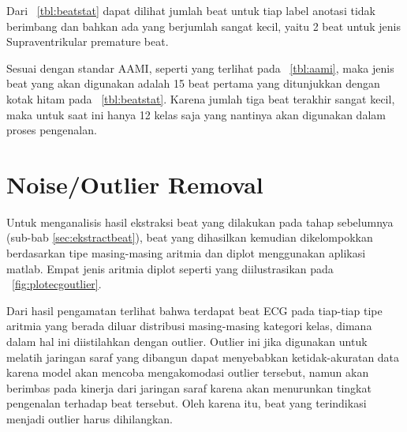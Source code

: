 Dari \tab~\ref{tbl:beatstat} dapat dilihat jumlah beat untuk tiap label anotasi
tidak berimbang dan bahkan ada yang berjumlah sangat kecil, yaitu 2 beat untuk
jenis Supraventrikular premature beat. 



Sesuai dengan standar AAMI, seperti yang terlihat pada \tab~\ref{tbl:aami}, maka
jenis beat yang akan digunakan adalah 15 beat pertama yang ditunjukkan dengan
kotak hitam pada \tab~\ref{tbl:beatstat}. Karena jumlah tiga beat terakhir
sangat kecil, maka untuk saat ini hanya 12 kelas saja yang nantinya akan digunakan
dalam proses pengenalan. 



\section{Noise/Outlier Removal}
Untuk menganalisis hasil ekstraksi beat yang dilakukan pada tahap sebelumnya
(sub-bab \ref{sec:ekstractbeat}), beat yang dihasilkan kemudian dikelompokkan
berdasarkan tipe masing-masing aritmia dan diplot menggunakan aplikasi matlab.
Empat jenis aritmia diplot seperti yang diilustrasikan pada
\pic~\ref{fig:plotecgoutlier}.


Dari hasil pengamatan terlihat bahwa terdapat beat ECG pada tiap-tiap tipe
aritmia yang berada diluar distribusi masing-masing kategori kelas, dimana
dalam hal ini diistilahkan dengan outlier. Outlier ini jika digunakan untuk
melatih jaringan saraf yang dibangun dapat menyebabkan ketidak-akuratan data
karena model akan mencoba mengakomodasi outlier tersebut, namun akan berimbas
pada kinerja dari jaringan saraf karena akan menurunkan tingkat pengenalan
terhadap beat tersebut. Oleh karena itu, beat yang terindikasi menjadi outlier
harus dihilangkan.

